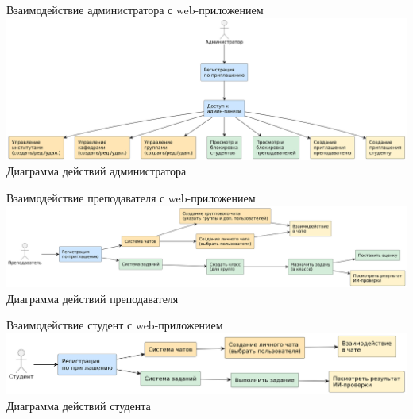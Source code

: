 \documentclass[aspectratio=169]{beamer}
\begin{document}
\begin{frame}{Взаимодействие администратора с web-приложением}
    \centering
    \includegraphics[width=\linewidth]{static/AdminFlowchart.png}
    \vspace{0.5em}
    {\small Диаграмма действий администратора}
\end{frame}

\begin{frame}{Взаимодействие преподавателя с web-приложением}
    \centering
    \includegraphics[width=\linewidth]{static/TeacherFlowchart.png}
    \vspace{0.5em}
    {\small Диаграмма действий преподавателя}
\end{frame}

\begin{frame}{Взаимодействие студент с web-приложением}
    \centering
    \includegraphics[width=\linewidth]{static/StudentFlowchart.png}
    \vspace{0.5em}
    {\small Диаграмма действий студента}
\end{frame}


%
%
%
\end{document}
